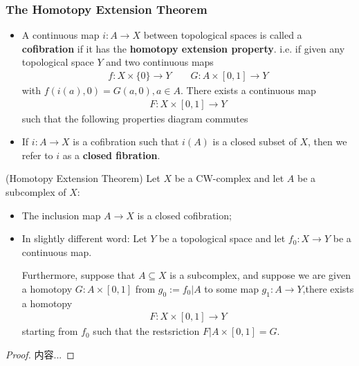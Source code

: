 \documentclass[Total.tex]{subfiles}
\begin{document}
	\subsubsection{The Homotopy Extension Theorem}
	\begin{Def}
		\begin{itemize}
			\item A continuous map $i:A\rightarrow X$ between topological spaces is called a \textbf{cofibration} if it has the \textbf{homotopy extension property}. i.e. if given any topological space $Y$ and two continuous maps
			\begin{gather*}
				f:X\times \{0\}\rightarrow Y\qquad G:A\times [0,1]\rightarrow Y
			\end{gather*}
			with $f(i(a),0)=G(a,0),a\in A$. There exists a continuous map
			\begin{gather*}
				F:X\times [0,1]\rightarrow Y
			\end{gather*}
			such that the following properties diagram commutes
			\begin{center}
			\end{center}
			\item If $i:A\rightarrow X$ is a cofibration such that $i(A)$ is a closed subset of $X$, then we refer to $i$ as a \textbf{closed fibration}.
		\end{itemize}
	\end{Def}
	\begin{theorem}
		(Homotopy Extension Theorem) Let $X$ be a CW-complex and let $A$ be a subcomplex of $X$:
		\begin{itemize}
			\item The inclusion map $A\rightarrow X$ is a closed cofibration;
			\item In slightly different word: Let $Y$ be a topological space and let $f_0:X\rightarrow Y$ be a continuous map. 
			
			Furthermore, suppose that $A\subseteq X$ is a subcomplex, and suppose we are given a homotopy $G:A\times [0,1]$ from $g_0:=f_0|A$ to some map $g_1:A\rightarrow Y$,there exists a homotopy
			\begin{gather*}
				F:X\times [0,1]\rightarrow Y
			\end{gather*}
			starting from $f_0$ such that the restsriction $F|A\times [0,1]=G$.
		\end{itemize}
	\end{theorem}
	\begin{proof}
		内容...
	\end{proof}
	
\end{document}
